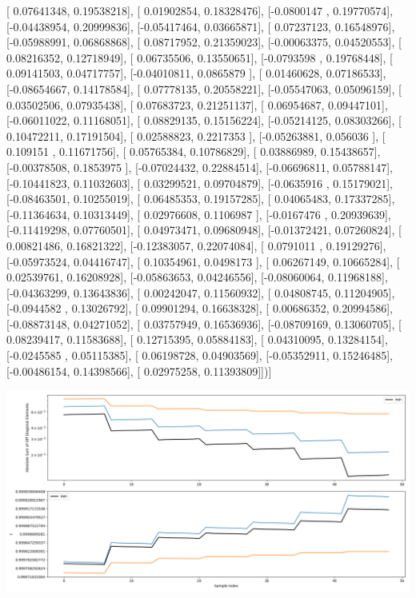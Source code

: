 \documentclass{article}
\begin{document}
       [ 0.07641348,  0.19538218],
       [ 0.01902854,  0.18328476],
       [-0.0800147 ,  0.19770574],
       [-0.04438954,  0.20999836],
       [-0.05417464,  0.03665871],
       [ 0.07237123,  0.16548976],
       [-0.05988991,  0.06868868],
       [ 0.08717952,  0.21359023],
       [-0.00063375,  0.04520553],
       [ 0.08216352,  0.12718949],
       [ 0.06735506,  0.13550651],
       [-0.0793598 ,  0.19768448],
       [ 0.09141503,  0.04717757],
       [-0.04010811,  0.0865879 ],
       [ 0.01460628,  0.07186533],
       [-0.08654667,  0.14178584],
       [ 0.07778135,  0.20558221],
       [-0.05547063,  0.05096159],
       [ 0.03502506,  0.07935438],
       [ 0.07683723,  0.21251137],
       [ 0.06954687,  0.09447101],
       [-0.06011022,  0.11168051],
       [ 0.08829135,  0.15156224],
       [-0.05214125,  0.08303266],
       [ 0.10472211,  0.17191504],
       [ 0.02588823,  0.2217353 ],
       [-0.05263881,  0.056036  ],
       [ 0.109151  ,  0.11671756],
       [ 0.05765384,  0.10786829],
       [ 0.03886989,  0.15438657],
       [-0.00378508,  0.1853975 ],
       [-0.07024432,  0.22884514],
       [-0.06696811,  0.05788147],
       [-0.10441823,  0.11032603],
       [ 0.03299521,  0.09704879],
       [-0.0635916 ,  0.15179021],
       [-0.08463501,  0.10255019],
       [ 0.06485353,  0.19157285],
       [ 0.04065483,  0.17337285],
       [-0.11364634,  0.10313449],
       [ 0.02976608,  0.1106987 ],
       [-0.0167476 ,  0.20939639],
       [-0.11419298,  0.07760501],
       [ 0.04973471,  0.09680948],
       [-0.01372421,  0.07260824],
       [ 0.00821486,  0.16821322],
       [-0.12383057,  0.22074084],
       [ 0.0791011 ,  0.19129276],
       [-0.05973524,  0.04416747],
       [ 0.10354961,  0.0498173 ],
       [ 0.06267149,  0.10665284],
       [ 0.02539761,  0.16208928],
       [-0.05863653,  0.04246556],
       [-0.08060064,  0.11968188],
       [-0.04363299,  0.13643836],
       [ 0.00242047,  0.11560932],
       [ 0.04808745,  0.11204905],
       [-0.0944582 ,  0.13026792],
       [ 0.09901294,  0.16638328],
       [ 0.00686352,  0.20994586],
       [-0.08873148,  0.04271052],
       [ 0.03757949,  0.16536936],
       [-0.08709169,  0.13060705],
       [ 0.08239417,  0.11583688],
       [ 0.12715395,  0.05884183],
       [ 0.04310095,  0.13284154],
       [-0.0245585 ,  0.05115385],
       [ 0.06198728,  0.04903569],
       [-0.05352911,  0.15246485],
       [-0.00486154,  0.14398566],
       [ 0.02975258,  0.11393809]])]
\begin{center}
\includegraphics[scale=.9]{report_pickled_controls134/control_dpn_all.png}

\end{center}
\end{document}
